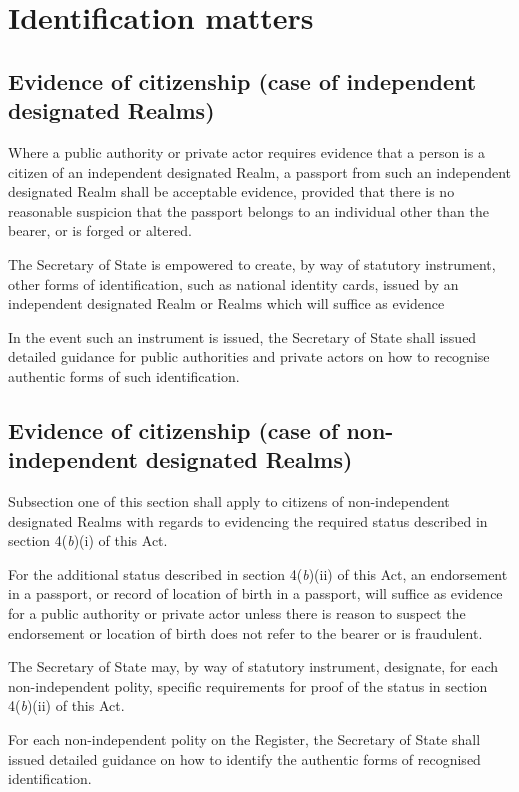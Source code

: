 \documentclass[private]{ukbill}
\begin{document}
\chapter{Identification matters}
\section{Evidence of citizenship (case of independent designated Realms)}
\begin{numstat}
\item Where a public authority or private actor requires evidence that a person is a citizen of an independent designated Realm, a passport from such an independent designated Realm shall be acceptable evidence, provided that there is no reasonable suspicion that the passport belongs to an individual other than the bearer, or is forged or altered.
\begin{alphstat}
\item The Secretary of State is empowered to create, by way of statutory instrument, other forms of identification, such as national identity cards, issued by an independent designated Realm or Realms which will suffice as evidence
\begin{romstat}
	\item In the event such an instrument is issued, the Secretary of State shall issued detailed guidance for public authorities and private actors on how to recognise authentic forms of such identification.
\end{romstat} 
\end{alphstat}
\end{numstat}

\section{Evidence of citizenship (case of non-independent designated Realms)}
\begin{numstat}
\item 	Subsection one of this section shall apply to citizens of non-independent designated Realms with regards to evidencing the required status described in section 4(\textit{b})(i) of this Act. 
\item For the additional status described in section 4(\textit{b})(ii) of this Act, an endorsement in a passport,  or record of location of birth in a passport, will  suffice as evidence for  a public authority or private actor unless there is reason to suspect the endorsement or location of birth does not refer to the bearer or is fraudulent.
\item The Secretary of State may, by way of statutory instrument, designate, for each non-independent polity, specific requirements for proof of the status in section 4(\textit{b})(ii) of this Act.
\item For each  non-independent polity on the Register, the Secretary of State shall issued detailed guidance on how to identify the authentic forms of recognised identification.
\end{numstat}
\end{document}
